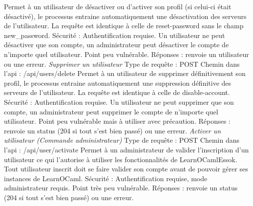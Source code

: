\documentclass{article}
\begin{document}
\newline
Permet à un utilisateur de désactiver ou d'activer son profil (si celui-ci était désactivé), le processus entraine automatiquement une désactivation des serveurs de l'utilisateur.
\newline
La requête est identique à celle de reset-password sans le champ new\_password.
\newline
Sécurité : Authentification requise. Un utilisateur ne peut désactiver que son compte, un administrateur peut désactiver le compte de n'importe quel utilisateur. Point peu vulnérable.
\newline
Réponses : renvoie un utilisateur ou une erreur.
\newline
\newline
\textit{Supprimer un utilisateur}
\newline
Type de requête : POST
\newline
Chemin dans l'api : /api/users/delete
\newline
Permet à un utilisateur de supprimer définitivement son profil, le processus entraine automatiquement une suppression définitive des serveurs de l'utilisateur.
\newline
La requête est identique à celle de disable-account.
\newline
Sécurité : Authentification requise. Un utilisateur ne peut supprimer que son compte, un administrateur peut supprimer le compte de n'importe quel utilisateur. Point peu vulnérable mais à utiliser avec précaution.
\newline
Réponses : renvoie un status (204 si tout s'est bien passé) ou une erreur.
\newline
\newline
\textit{Activer un utilisateur (Commande administrateur)}
\newline
Type de requête : POST
\newline
Chemin dans l'api : /api/user/activate
\newline
Permet à un administrateur de valider l'inscription d'un utilisateur ce qui l'autorise à utiliser les fonctionnalités de LearnOCamlEssok.
\newline
Tout utilisateur inscrit doit se faire valider son compte avant de pouvoir gérer ses instances de LearnOCaml.
\newline
Sécurité : Authentification requise, mode administrateur requis. Point très peu vulnérable.
\newline
Réponses : renvoie un status (204 si tout s'est bien passé) ou une erreur.
\end{document}
